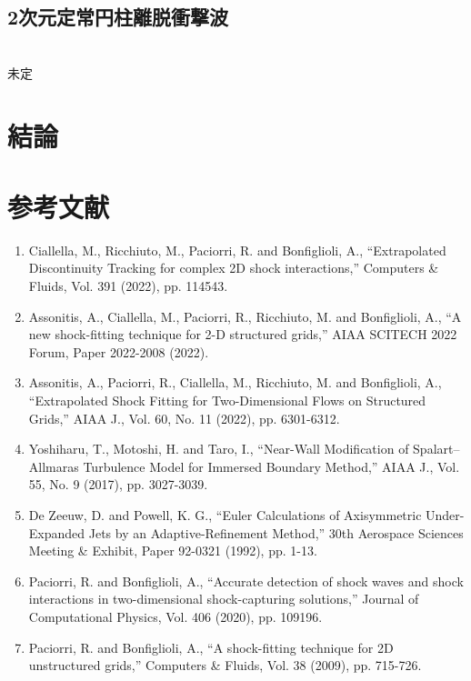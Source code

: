 \documentclass[a4j]{jarticle}
\begin{document}
\subsection{2次元定常円柱離脱衝撃波}\label{subsec:2Dcirc}
\mbox{}\\[-3.0ex]

未定

\section{結論}

\section*{参考文献}

\begin{enumerate}
    \item Ciallella, M., Ricchiuto, M., Paciorri, R. and Bonfiglioli, A., ``Extrapolated Discontinuity Tracking for complex 2D shock interactions,''
     Computers \& Fluids, Vol. 391 (2022), pp. 114543.
\label{ref:eDIT}
    \item Assonitis, A., Ciallella, M., Paciorri, R., Ricchiuto, M. and Bonfiglioli, A., ``A new shock-fitting technique for 2-D structured grids,''
     AIAA SCITECH 2022 Forum, Paper 2022-2008 (2022).
\label{ref:SESF}
    \item Assonitis, A., Paciorri, R., Ciallella, M., Ricchiuto, M. and Bonfiglioli, A., ``Extrapolated Shock Fitting for Two-Dimensional Flows on Structured Grids,''
     AIAA J., Vol. 60, No. 11 (2022), pp. 6301-6312.
\label{ref:SF}
    \item Yoshiharu, T., Motoshi, H. and Taro, I., ``Near-Wall Modification of Spalart–Allmaras Turbulence Model for Immersed Boundary Method,''
     AIAA J., Vol. 55, No. 9 (2017), pp. 3027-3039.
\label{ref:IBM}
    \item De Zeeuw, D. and Powell, K. G., ``Euler Calculations of Axisymmetric Under-Expanded Jets by an Adaptive-Refinement Method,''
     30th Aerospace Sciences Meeting \& Exhibit, Paper 92-0321 (1992), pp. 1-13. 
\label{ref:AMR}
    \item Paciorri, R. and Bonfiglioli, A., ``Accurate detection of shock waves and shock interactions in two-dimensional shock-capturing solutions,''
     Journal of Computational Physics, Vol. 406 (2020), pp. 109196.
\label{ref:intera}
     \item Paciorri, R. and Bonfiglioli, A., ``A shock-fitting technique for 2D unstructured grids,''
      Computers \& Fluids, Vol. 38 (2009), pp. 715-726.
\label{ref:effdomain}
    \end{enumerate}
\end{document}
